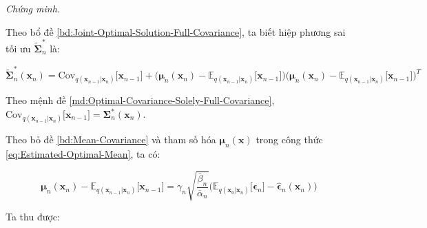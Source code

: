 \documentclass[14pt, a4paper]{article}
\numberwithin{equation}{section}
\numberwithin{figure}{section}
\numberwithin{dl}{section}
\numberwithin{md}{section}
\numberwithin{bd}{section}
\numberwithin{dn}{section}
\numberwithin{hq}{section}
\begin{document}
    \textit{Chứng minh.}

    Theo bổ đề \ref{bd:Joint-Optimal-Solution-Full-Covariance}, ta biết hiệp phương sai tối ưu $\tilde{\boldsymbol{\Sigma}}_n^{\ast}$ là:

    \begin{equation}
        \tilde{\boldsymbol{\Sigma}}_n^{\ast} (\boldsymbol{x}_n) = \mathrm{Cov}_{q(\boldsymbol{x}_{n-1} \vert \boldsymbol{x}_n)} \lbrack \boldsymbol{x}_{n-1} \rbrack + \big( \boldsymbol{\mu}_n (\boldsymbol{x}_n) - \mathbb{E}_{q(\boldsymbol{x}_{n-1} \vert \boldsymbol{x}_n)} \lbrack \boldsymbol{x}_{n-1} \rbrack \big)\big( \boldsymbol{\mu}_n (\boldsymbol{x}_n) - \mathbb{E}_{q(\boldsymbol{x}_{n-1} \vert \boldsymbol{x}_n)} \lbrack \boldsymbol{x}_{n-1} \rbrack \big)^T
    \end{equation}

    Theo mệnh đề \ref{md:Optimal-Covariance-Solely-Full-Covariance}, $\mathrm{Cov}_{q(\boldsymbol{x}_{n-1} \vert \boldsymbol{x}_n)} \lbrack \boldsymbol{x}_{n-1} \rbrack = \boldsymbol{\Sigma}_n^{\ast} (\boldsymbol{x}_n)$.

    Theo bỏ đề \ref{bd:Mean-Covariance} và tham số hóa $\boldsymbol{\mu}_n (\boldsymbol{x})$ trong công thức \ref{eq:Estimated-Optimal-Mean}, ta có:

    \begin{equation}
        \boldsymbol{\mu}_n (\boldsymbol{x}_n) - \mathbb{E}_{q(\boldsymbol{x}_{n-1} \vert \boldsymbol{x}_n)} \lbrack \boldsymbol{x}_{n-1} \rbrack = \gamma_n \sqrt{\dfrac{\overline{\beta}_n}{\overline{\alpha}_n}} \big( \mathbb{E}_{q(\boldsymbol{x}_0 \vert \boldsymbol{x}_n)} \lbrack \boldsymbol{\epsilon}_n \rbrack - \hat{\boldsymbol{\epsilon}}_n (\boldsymbol{x}_n) \big)
    \end{equation}

    Ta thu được:
\end{document}
